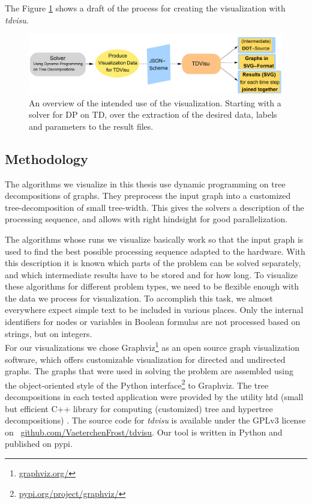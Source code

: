 \documentclass[a4paper, 12pt, bibliography=totoc]{scrartcl}
\begin{document}
The Figure \ref{fig:overviewprog} shows a draft of the process for creating the visualization with \textit{tdvisu}.

\begin{figure}
	\centering
		\includegraphics[width=1\linewidth]{images/OverviewProgram.png}
		
	\caption[Visualization Overview]{An overview of the intended use of the visualization. Starting with a solver for DP on TD, over the extraction of the desired data, labels and parameters to the result files.}
	\label{fig:overviewprog}
\end{figure}

\newpage
\subsection{Methodology}

The algorithms we visualize in this thesis use dynamic programming on tree decompositions of graphs.
They preprocess the input graph into a customized tree-decomposition of small tree-width.
This gives the solvers a description of the processing sequence, and allows 
with right hindsight for good parallelization.

The algorithms whose runs we visualize basically work so that the input graph is used to find the best possible processing sequence adapted to the hardware.
With this description it is known which parts of the problem can be solved separately, and which intermediate results have to be stored and for how long. To visualize these algorithms for different problem types, we need to be flexible enough with the data we process for visualization. To accomplish this task, we almost everywhere expect simple text to be included in various places. Only the internal identifiers for nodes or variables in Boolean formulas are not processed based on strings, but on integers.\\

For our visualizations we chose {Graphviz}\footnote{\url{graphviz.org/}} as an open source graph visualization software, which offers customizable visualization for directed and undirected graphs.
The graphs that were used in solving the problem are assembled using the object-oriented style of the Python interface\footnote{\url{pypi.org/project/graphviz/}} to Graphviz.
The tree decompositions in each tested application were provided by the utility {htd} (small but efficient C++ library for computing (customized) tree and hypertree decompositions) \cite{htd}.
The source code for \textit{tdvisu} is available under the GPLv3 license \\on
\mbox{ \url{github.com/VaeterchenFrost/tdvisu}}. Our tool is written in Python and published on pypi.
\end{document}
